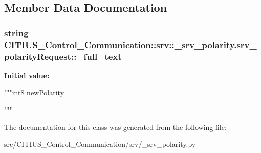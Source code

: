 \subsection{\-Member \-Data \-Documentation}
\hypertarget{class_c_i_t_i_u_s___control___communication_1_1srv_1_1__srv__polarity_1_1srv__polarity_request_ada3c8845537475d7dfdfa06901901fdc}{
\subsubsection[{\-\_\-full\-\_\-text}]{\setlength{\rightskip}{0pt plus 5cm}string \-C\-I\-T\-I\-U\-S\-\_\-\-Control\-\_\-\-Communication\-::srv\-::\-\_\-srv\-\_\-polarity.\-srv\-\_\-polarity\-Request\-::\-\_\-full\-\_\-text}}\label{class_c_i_t_i_u_s___control___communication_1_1srv_1_1__srv__polarity_1_1srv__polarity_request_ada3c8845537475d7dfdfa06901901fdc}
{\bfseries \-Initial value\-:}
\begin{DoxyCode}
"""int8 newPolarity

"""
\end{DoxyCode}


\-The documentation for this class was generated from the following file\-:\begin{DoxyCompactItemize}
\item 
src/\-C\-I\-T\-I\-U\-S\-\_\-\-Control\-\_\-\-Communication/srv/\-\_\-srv\-\_\-polarity.\-py\end{DoxyCompactItemize}
